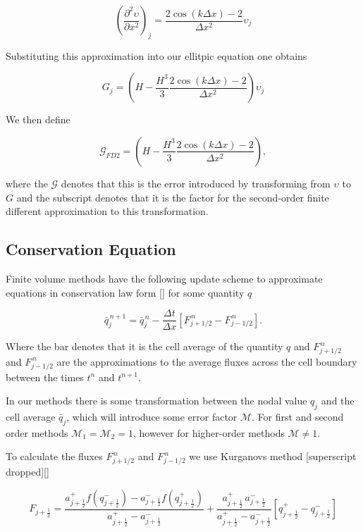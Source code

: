 \[ \left(\frac{\partial^2 \upsilon}{\partial x^2}\right)_j = \frac{ 2\cos\left(k\Delta x\right) - 2 }{\Delta x^2} \upsilon_{j}\]

Substituting this approximation into our ellitpic equation one obtains

\[G_j = \left(H -\frac{H^3}{3} \frac{ 2\cos\left(k\Delta x\right) - 2 }{\Delta x^2}\right) \upsilon_{j}\] 

We then define 

\[\mathcal{G}_{FD2} = \left(H -\frac{H^3}{3} \frac{ 2\cos\left(k\Delta x\right) - 2 }{\Delta x^2}\right),\]

where the $\mathcal{G}$ denotes that this is the error introduced by transforming from $\upsilon$ to $G$ and the subscript denotes that it is the factor for the second-order finite different approximation to this transformation. 


\subsection{Conservation Equation}

Finite volume methods have the following update scheme to approximate equations in conservation law form [] for some quantity $q$

\[\bar{q}^{\,n + 1}_{j} = \bar{q}^{\,n}_{j} - \frac{\Delta t}{\Delta x} \left[F^{\,n} _{j+1/2} - F^{\,n} _{j-1/2} \right].\]

Where the bar denotes that it is the cell average of the quantity $q$ and $F^{\,n} _{j+1/2}$ and $F^{\,n} _{j-1/2}$ are the approximations to the average fluxes across the cell boundary between the times $t^n$ and $t^{n+1}$. 

In our methods there is some transformation between the nodal value $q_j$ and the cell average $\bar{q}_j$, which will introduce some error factor $\mathcal{M}$. For first and second order methods $\mathcal{M}_1 = \mathcal{M}_2 = 1$, however for higher-order methods $\mathcal{M} \neq 1$.

To calculate the fluxes $F^{\,n} _{j+1/2}$ and $F^{\,n} _{j-1/2}$ we use Kurganovs method [superscript dropped][]

\begin{equation*}
F_{j+\frac{1}{2}} = \dfrac{a^+_{j+\frac{1}{2}} f\left(q^-_{j+\frac{1}{2}}\right) - a^-_{j+\frac{1}{2}} f\left(q^+_{j+\frac{1}{2}}\right)}{a^+_{j+\frac{1}{2}} - a^-_{j+\frac{1}{2}}}  + \dfrac{a^+_{j+\frac{1}{2}} \, a^-_{j+\frac{1}{2}}}{a^+_{j+\frac{1}{2}} - a^-_{j+\frac{1}{2}}} \left [ q^+_{j+\frac{1}{2}} - q^-_{j+\frac{1}{2}} \right ]
\end{equation*}

